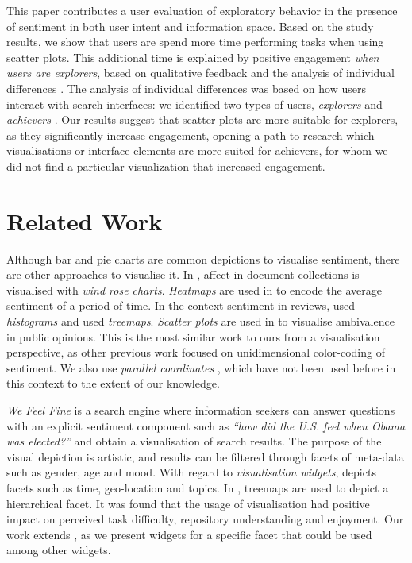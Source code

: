 \documentclass{sig-alternate}
\begin{document}
This paper contributes a user evaluation of exploratory behavior in the presence of sentiment in both user intent and information space. 
Based on the study results, we show that users are spend more time performing tasks when using scatter plots. 
This additional time is explained by positive engagement \textit{when users are explorers}, based on qualitative feedback and the analysis of individual differences \cite{chen2000individual}.
The analysis of individual differences was based on how users interact with search interfaces: we identified two types of users, \emph{explorers} and \emph{achievers} \cite{bartle1996hearts}. 
Our results suggest that scatter plots are more suitable for explorers, as they significantly increase engagement, opening a path to research which visualisations or interface elements are more suited for achievers, for whom we did not find a particular visualization that increased engagement.


\section{Related Work}

Although bar and pie charts are common depictions to visualise sentiment, there are other approaches to visualise it. 
In \cite{gregory2006user}, affect in document collections is visualised with \textit{wind rose charts}.
\textit{Heatmaps} are used in \cite{diakopoulos2010diamonds} to encode the average sentiment of a period of time. In the context sentiment in reviews, \cite{alperopinionblocks} used \textit{histograms} and \cite{carenini2006interactive} used \textit{treemaps}.
\textit{Scatter plots} are used in \cite{panger2013visualizing} to visualise ambivalence in public opinions. 
This is the most similar work to ours from a visualisation perspective, as other previous work focused on unidimensional color-coding of sentiment. 
We also use \emph{parallel coordinates} \cite{inselberg1985plane}, which have not been used before in this context to the extent of our knowledge.

\emph{We Feel Fine} \cite{kamvar2011we} is a search engine where information seekers can answer questions with an explicit sentiment component such as \emph{``how did the U.S. feel when Obama was elected?''} and obtain a visualisation of search results. 
The purpose of the visual depiction is artistic, and results can be filtered through facets of meta-data such as gender, age and mood. 
With regard to \emph{visualisation widgets}, \cite{dork2008visgets} depicts facets such as time, geo-location and topics. 
In \cite{clarkson2009resultmaps}, treemaps are used to depict a hierarchical facet. 
It was found that the usage of visualisation had positive impact on perceived task difficulty, repository understanding and enjoyment.
Our work extends \cite{dork2008visgets}, as we present widgets for a specific facet that could be used among other widgets.
\end{document}
